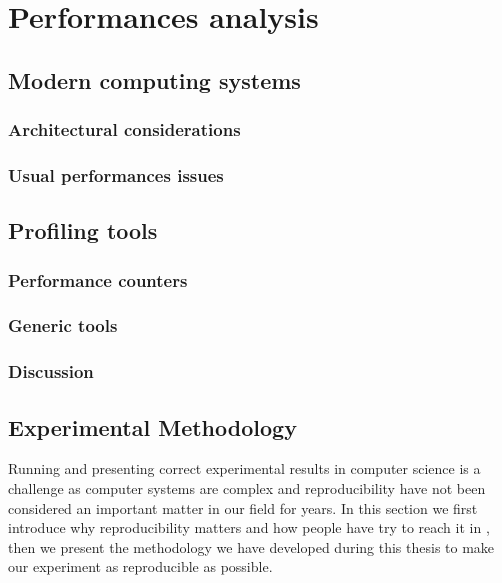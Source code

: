 \chapter{Performances analysis}

\section{Modern computing systems}

\subsection{Architectural considerations}


\subsection{Usual performances issues}



\section{Profiling tools}


\subsection{Performance counters}


\subsection{Generic tools}


\subsection{Discussion}

\section{Experimental Methodology}

Running and presenting correct experimental results in computer science is a
challenge as computer systems are complex and reproducibility have not been
considered an important matter in our field for years. In this section we
first introduce why reproducibility matters and how people have try to reach
it in \HPC, then we present the methodology we have developed during this
thesis to make our experiment as reproducible as possible.


